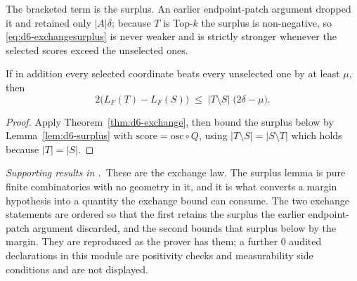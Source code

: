 
The bracketed term is the surplus. An earlier endpoint-patch argument dropped it and retained
only $|A|\delta$; because $T$ is Top-$k$ the surplus is non-negative, so
\eqref{eq:d6-exchangesurplus} is never weaker and is strictly stronger whenever the selected
scores exceed the unselected ones.

\begin{theorem}
\label{thm:d6-marginexchange}
If in addition every selected coordinate beats every unselected one by at least $\mu$, then
\begin{equation}
2\bigl(L_{F}(T)-L_{F}(S)\bigr)\;\leq\;|T\setminus S|\;\bigl(2\delta-\mu\bigr).
\label{eq:d6-marginexchange}
\end{equation}
\end{theorem}

\begin{proof}
Apply Theorem~\ref{thm:d6-exchange}, then bound the surplus below by Lemma~\ref{lem:d6-surplus}
with $\mathrm{score}=\mathrm{osc}\circ Q$, using $|T\setminus S|=|S\setminus T|$ which holds
because $|T|=|S|$.
\end{proof}


\noindent\emph{Supporting results in .}~These are the exchange law. The surplus lemma is pure finite combinatorics with no geometry in it, and it is what converts a margin hypothesis into a quantity the exchange bound can consume. The two exchange statements are ordered so that the first retains the surplus the earlier endpoint-patch argument discarded, and the second bounds that surplus below by the margin. They are reproduced as the prover has them; a further $0$ audited declarations in this module are positivity checks and measurability side conditions and are not displayed.


